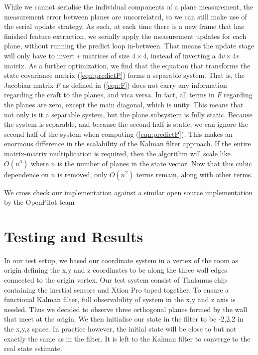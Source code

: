 \documentclass[]{article}
\begin{document}
{While we cannot serialise the individual components of a plane measurement, the measurement error between planes are uncorrelated, so we can still make use of the serial update strategy. As such, at each time there is a new frame that has finished feature extraction, we serially apply the measurement updates for each plane, without running the predict loop in-between.
That means the update stage will only have to invert $v$ matrices of size $4\times4$, instead of inverting a $4v \times 4v$ matrix. 
As a further optimization, we find that the equation that transforms the state covariance matrix (\ref{eqn:predictP}) forms a separable system. That is, the Jacobian matrix $F$ as defined in (\ref{eqn:F}) does not carry any information regarding the craft to the planes, and vica versa.
In fact, all terms in $F$ regarding the planes are zero, except the main diagonal, which is unity. This means that not only is it a separable system, but the plane subsystem is fully static.
Because the system is separable, and because the second half is static, we can ignore the second half of the system when computing (\ref{eqn:predictP}).
This makes an enormous difference in the scalability of the Kalman filter approach. If the entire matrix-matrix multiplication is required, then the algorithm will scale like $O(n^3)$ where $n$ is the number of planes in the state vector. Now that this cubic dependence on $n$ is removed, only $O(n^2)$ terms remain, along with other terms.

	We cross check our implementation against a similar open source implementation by the OpenPilot team %



\section{Testing and Results} %
\label{sub:testing_kalman}
In our test setup, we based our coordinate system in a vertex of the room as origin defining the x,y and z coordinates to be along the three wall edges connected to the origin vertex. Our test system consist of Thalamus chip containing the inertial sensors and Xtion Pro taped together. To ensure a functional Kalman filter, full observability of system in the x,y and z axis is needed. Thus we decided to observe three orthogonal planes formed by the wall that meet at the origin. We then initialise our state in the filter to be -2,2,2 in the x,y,z space. In practice however, the initial state will be close to but not exactly the same as in the filter. It is left to the Kalman filter to converge to the real state estimate.

}
\end{document}
